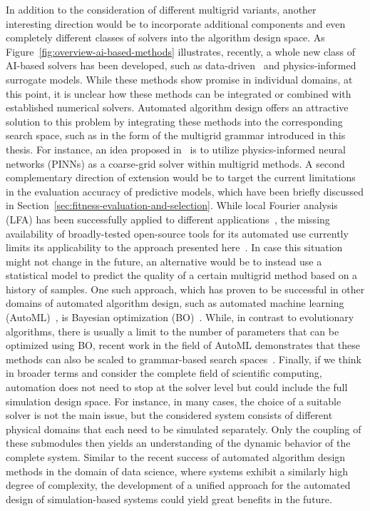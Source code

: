 In addition to the consideration of different multigrid variants, another interesting direction would be to incorporate additional components and even completely different classes of solvers into the algorithm design space.
As Figure~\ref{fig:overview-ai-based-methods} illustrates, recently, a whole new class of AI-based solvers has been developed, such as data-driven~\cite{thuerey2020deep} and physics-informed~\cite{karniadakis2021physics} surrogate models.
While these methods show promise in individual domains, at this point, it is unclear how these methods can be integrated or combined with established numerical solvers.
Automated algorithm design offers an attractive solution to this problem by integrating these methods into the corresponding search space, such as in the form of the multigrid grammar introduced in this thesis.
For instance, an idea proposed in~\cite{markidis2021old} is to utilize physics-informed neural networks (PINNs) as a coarse-grid solver within multigrid methods.
A second complementary direction of extension would be to target the current limitations in the evaluation accuracy of predictive models, which have been briefly discussed in Section~\ref{sec:fitness-evaluation-and-selection}.
While local Fourier analysis (LFA) has been successfully applied to different applications~\cite{rodrigo2017validity}, the missing availability of broadly-tested open-source tools for its automated use currently limits its applicability to the approach presented here~\cite{schmitt2020constructing}.
In case this situation might not change in the future, an alternative would be to instead use a statistical model to predict the quality of a certain multigrid method based on a history of samples.
One such approach, which has proven to be successful in other domains of automated algorithm design, such as automated machine learning (AutoML)~\cite{kotthoff2019auto,snoek2012practical}, is Bayesian optimization (BO)~\cite{frazier2018tutorial}.
While, in contrast to evolutionary algorithms, there is usually a limit to the number of parameters that can be optimized using BO, recent work in the field of AutoML demonstrates that these methods can also be scaled to grammar-based search spaces~\cite{schrodi2022towards}.
Finally, if we think in broader terms and consider the complete field of scientific computing, automation does not need to stop at the solver level but could include the full simulation design space.
For instance, in many cases, the choice of a suitable solver is not the main issue, but the considered system consists of different physical domains that each need to be simulated separately.
Only the coupling of these submodules then yields an understanding of the dynamic behavior of the complete system.
Similar to the recent success of automated algorithm design methods in the domain of data science, where systems exhibit a similarly high degree of complexity, the development of a unified approach for the automated design of simulation-based systems could yield great benefits in the future.